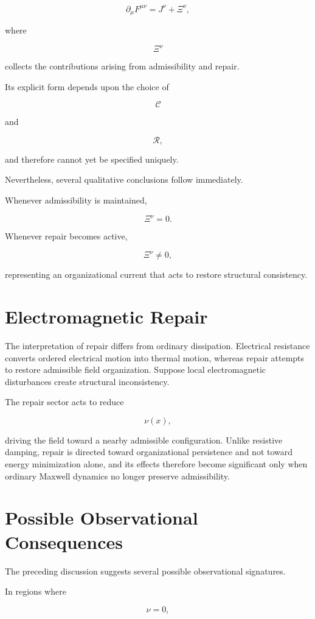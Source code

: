 \documentclass[11pt,oneside]{book}
\numberwithin{equation}{chapter}
\theoremstyle{definition}
\theoremstyle{plain}
\begin{document}
\[
\partial_\mu
F^{\mu\nu}
=
J^\nu
+
\Xi^\nu,
\]

where

\[
\Xi^\nu
\]

collects the contributions arising from admissibility and repair.

Its explicit form depends upon the choice of

\[
\mathcal C
\]

and

\[
\mathcal R,
\]

and therefore cannot yet be specified uniquely.

Nevertheless, several qualitative conclusions follow immediately.

Whenever admissibility is maintained,

\[
\Xi^\nu=0.
\]

Whenever repair becomes active,

\[
\Xi^\nu
\neq
0,
\]

representing an organizational current that acts to restore structural
consistency.

\section{Electromagnetic Repair}

The interpretation of repair differs from ordinary dissipation. Electrical resistance converts ordered electrical motion into thermal motion, whereas repair attempts to restore admissible field organization. Suppose local electromagnetic disturbances create structural inconsistency.

The repair sector acts to reduce

\[
\nu(x),
\]

driving the field toward a nearby admissible configuration. Unlike resistive damping, repair is directed toward organizational persistence and not toward energy minimization alone, and its effects therefore become significant only when ordinary Maxwell dynamics no longer preserve admissibility.

\section{Possible Observational Consequences}

The preceding discussion suggests several possible observational
signatures.

In regions where

\[
\nu=0,
\]
\end{document}
